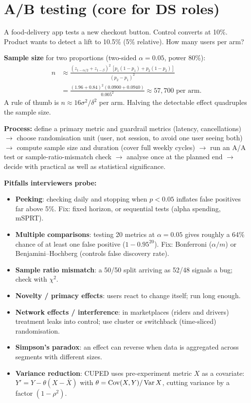 \section{A/B testing (core for DS roles)}

\begin{realworld}
A food-delivery app tests a new checkout button. Control converts at 10\%. Product wants to detect a lift to 10.5\% (5\% relative). How many users per arm?
\end{realworld}

\textbf{Sample size} for two proportions (two-sided $\alpha=0.05$, power 80\%):
\begin{align*}n&\approx\frac{(z_{1-\alpha/2}+z_{1-\beta})^2\,[p_1(1-p_1)+p_2(1-p_2)]}{(p_2-p_1)^2}\\&=\frac{(1.96+0.84)^2(0.0900+0.0940)}{0.005^2}\approx 57{,}700\text{ per arm.}\end{align*}
A rule of thumb is $n\approx16\sigma^2/\delta^2$ per arm. Halving the detectable effect quadruples the sample size.

\textbf{Process:} define a primary metric and guardrail metrics (latency, cancellations) $\to$ choose randomisation unit (user, not session, to avoid one user seeing both) $\to$ compute sample size and duration (cover full weekly cycles) $\to$ run an A/A test or sample-ratio-mismatch check $\to$ analyse once at the planned end $\to$ decide with practical as well as statistical significance.

\textbf{Pitfalls interviewers probe:}
\begin{itemize}
  \item \textbf{Peeking}: checking daily and stopping when $p<0.05$ inflates false positives far above 5\%. Fix: fixed horizon, or sequential tests (alpha spending, mSPRT).
  \item \textbf{Multiple comparisons}: testing 20 metrics at $\alpha=0.05$ gives roughly a 64\% chance of at least one false positive ($1-0.95^{20}$). Fix: Bonferroni ($\alpha/m$) or Benjamini--Hochberg (controls false discovery rate).
  \item \textbf{Sample ratio mismatch}: a 50/50 split arriving as 52/48 signals a bug; check with $\chi^2$.
  \item \textbf{Novelty / primacy effects}: users react to change itself; run long enough.
  \item \textbf{Network effects / interference}: in marketplaces (riders and drivers) treatment leaks into control; use cluster or switchback (time-sliced) randomisation.
  \item \textbf{Simpson's paradox}: an effect can reverse when data is aggregated across segments with different sizes.
  \item \textbf{Variance reduction}: CUPED uses pre-experiment metric $X$ as a covariate: $Y'=Y-\theta(X-\bar X)$ with $\theta=\operatorname{Cov}(X,Y)/\operatorname{Var} X$, cutting variance by a factor $(1-\rho^2)$.
\end{itemize}

